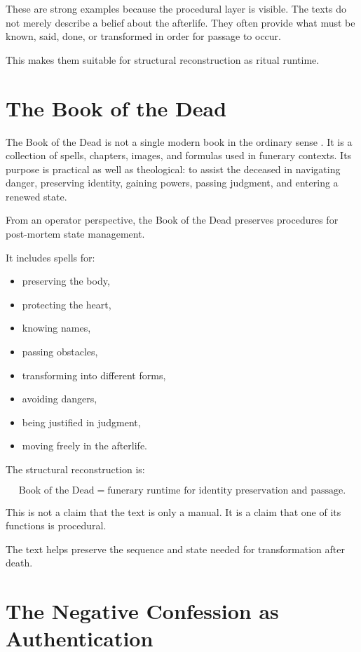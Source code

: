 \documentclass[11pt]{book}
\begin{document}
These are strong examples because the procedural layer is visible. The texts do not merely describe a belief about the afterlife. They often provide what must be known, said, done, or transformed in order for passage to occur.

This makes them suitable for structural reconstruction as ritual runtime.

\section{The Book of the Dead}

The Book of the Dead is not a single modern book in the ordinary sense \cite{Allen1974BookDead,Faulkner1972BookDead,Assmann2005DeathSalvation}. It is a collection of spells, chapters, images, and formulas used in funerary contexts. Its purpose is practical as well as theological: to assist the deceased in navigating danger, preserving identity, gaining powers, passing judgment, and entering a renewed state.

From an operator perspective, the Book of the Dead preserves procedures for post-mortem state management.

It includes spells for:

\begin{itemize}
    \item preserving the body,
    \item protecting the heart,
    \item knowing names,
    \item passing obstacles,
    \item transforming into different forms,
    \item avoiding dangers,
    \item being justified in judgment,
    \item moving freely in the afterlife.
\end{itemize}

The structural reconstruction is:

\[
\text{Book of the Dead} = \text{funerary runtime for identity preservation and passage}.
\]

This is not a claim that the text is only a manual. It is a claim that one of its functions is procedural.

The text helps preserve the sequence and state needed for transformation after death.

\section{The Negative Confession as Authentication}
\end{document}
